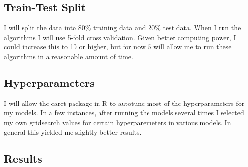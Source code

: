\documentclass[12pt]{article} %
\begin{document}
\subsection{Train-Test Split}
I will split the data into 80\% training data and 20\% test data. When I run the algorithms I will use 5-fold cross validation. Given better computing power, I could increase this to 10 or higher, but for now 5 will allow me to run these algorithms in a reasonable amount of time. 

\subsection{Hyperparameters}
I will allow the caret package in R to autotune most of the hyperparameters for my models. In a few instances, after running the models several times I selected my own gridsearch values for certain hyperparemeters in various models. In general this yielded me slightly better results.

\subsection{Results}
\end{document}
